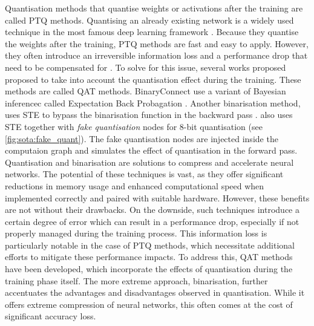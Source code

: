 Quantisation methods that quantise weights or activations after the training are
called \ac{PTQ} methods. Quantising an already existing network is a widely used
technique in the most famous deep learning framework
\cite{ncnn,qnnpack,snapdragon,tensorrt}. Because they quantise the weights after
the training, \ac{PTQ} methods are fast and easy to apply. However, they often
introduce an irreversible information loss and  a performance drop that need to
be compensated for \cite{DBLP:journals/ijon/LiangGWSZ21}. To solve for this
issue, several works proposed proposed to take into account the quantisation
effect during the training. These methods are called \ac{QAT} methods.
BinaryConnect \cite{courbariaux2015binaryconnect} use a variant of Bayesian
inferencec called Expectation Back Probagation
\cite{DBLP:journals/corr/ChengSML15,DBLP:conf/nips/SoudryHM14}. Another
binarisation method, uses \ac{STE} \cite{DBLP:journals/corr/BengioLC13} to
bypass the binarisation function in the backward pass
\cite{DBLP:conf/nips/HubaraCSEB16}. \cite{DBLP:conf/cvpr/JacobKCZTHAK18} also
uses \ac{STE} together with \emph{fake quantisation} nodes for 8-bit
quantisation (see \cref{fig:sota:fake_quant}). The fake quantisation nodes are
injected inside the computaion graph and simulates the effect of quantisation in
the forward pass.\\

Quantisation and binarisation are solutions to compress and accelerate neural
networks. The potential of these techniques is vast, as they offer significant
reductions in memory usage and enhanced computational speed when implemented
correctly and paired with suitable hardware. However, these benefits are not
without their drawbacks. On the downside, such techniques introduce a certain
degree of error which can result in a performance drop, especially if not
properly managed during the training process. This information loss is
particularly notable in the case of \acl{PTQ} methods, which necessitate
additional efforts to mitigate these performance impacts. To address this,
\ac{QAT} methods have been developed, which incorporate the effects of
quantisation during the training phase itself. The more extreme approach,
binarisation, further accentuates the advantages and disadvantages observed in
quantisation. While it offers extreme compression of neural networks, this often
comes at the cost of significant accuracy loss.\\


